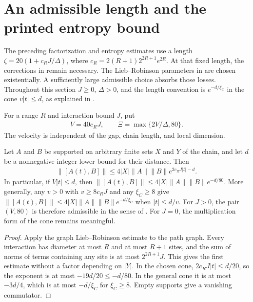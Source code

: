 \section{An admissible length and the printed entropy bound}
\label{sec:hastings_source_length}

The preceding factorization and entropy estimates use a length
$\zeta=20(1+c_RJ/\Delta)$, where
$c_R=2(R+1)2^{2R+1}e^{2R}$. At that fixed length, the corrections in
\cite{gap:hastings07_gaussian_average_exponent,gap:hastings07_doubling_constants}
remain necessary. The Lieb--Robinson parameters in
\cite[lines 96--112, 139--142]{Hastings2007AreaLaw} are chosen existentially.
A sufficiently large admissible choice absorbs those losses. Throughout this
section $J\ge0$, $\Delta>0$, and the length convention is
$e^{-d/\xi_C}$ in the cone $v|t|\le d$, as explained in
\cite{gap:hastings07_lemma1_decay_length}.

\begin{definition}
    \label{def:hastings_source_length}
    \leanok
    For a range $R$ and interaction bound $J$, put
    \begin{align*}
        V=40c_RJ,\qquad \Xi=\max\{2V/\Delta,80\}.
    \end{align*}
    The velocity is independent of the gap, chain length, and local dimension.
\end{definition}

\begin{lemma}
    \label{lem:hastings_source_lieb_robinson}
    \leanok
    Let $A$ and $B$ be supported on arbitrary finite sets $X$ and $Y$ of the
    chain, and let $d$ be a nonnegative integer lower bound for their distance.
    Then
    \begin{align*}
        \|[A(t),B]\|\le4|X|\|A\|\|B\|
        e^{2c_RJ|t|-d}.
    \end{align*}
    In particular, if $V|t|\le d$, then
    $\|[A(t),B]\|\le4|X|\|A\|\|B\|e^{-d/80}$.
    More generally, any $v>0$ with $v\ge8c_RJ$ and any $\xi_C\ge8$ give
    $\|[A(t),B]\|\le4|X|\|A\|\|B\|e^{-d/\xi_C}$ when $|t|\le d/v$.
    For $J>0$, the pair $(V,80)$ is therefore admissible in the sense of
    \cite[eq. (lrb)]{Hastings2007AreaLaw}. For $J=0$, the multiplication
    form of the cone remains meaningful.
\end{lemma}
\begin{proof}\leanok
    Apply the graph Lieb--Robinson estimate to the path graph. Every
    interaction has diameter at most $R$ and at most $R+1$ sites, and the
    sum of norms of terms containing any site is at most $2^{2R+1}J$.
    This gives the first estimate without a factor depending on $|Y|$.
    In the chosen cone, $2c_RJ|t|\le d/20$, so the exponent is at most
    $-19d/20\le-d/80$. In the general cone it is at most $-3d/4$,
    which is at most $-d/\xi_C$ for $\xi_C\ge8$. Empty supports give
    a vanishing commutator.
\end{proof}

